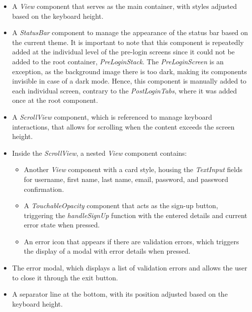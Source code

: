 \begin{itemize}
    \item A \textit{View} component that serves as the main container, with styles adjusted based on the keyboard height. 
    \item A \textit{StatusBar} component to manage the appearance of the status bar based on the current theme. It is important to note that this component is repeatedly added at the individual level of the pre-login screens since it could not be added to the root container, \textit{PreLoginStack}. The \textit{PreLoginScreen} is an exception, as the background image there is too dark, making its components invisible in case of a dark mode. Hence, this component is manually added to each individual screen, contrary to the \textit{PostLoginTabs}, where it was added once at the root component.
    \item A \textit{ScrollView} component, which is referenced to manage keyboard interactions, that allows for scrolling when the content exceeds the screen height. 
    \item Inside the \textit{ScrollView}, a nested \textit{View} component contains:
    \begin{itemize}
        \item Another \textit{View} component with a card style, housing the \textit{TextInput} fields for username, first name, last name, email, password, and password confirmation.
        \item A \textit{TouchableOpacity} component that acts as the sign-up button, triggering the \textit{handleSignUp} function with the entered details and current error state when pressed.
        \item An error icon that appears if there are validation errors, which triggers the display of a modal with error details when pressed.
    \end{itemize}
    \item The error modal, which displays a list of validation errors and allows the user to close it through the exit button.
    \item A separator line at the bottom, with its position adjusted based on the keyboard height.
\end{itemize}

